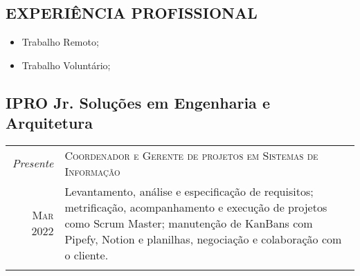     \begin{framed}
        \section{EXPERIÊNCIA PROFISSIONAL}
        \begin{itemize}
          \item Trabalho Remoto;
          \item Trabalho Voluntário;
    
        \end{itemize}
    
        \subsection{  IPRO Jr. Soluções em Engenharia e Arquitetura}
    
        \begin{tabular}{r|p{5cm}}
          \emph{Presente}   & \textsc{Coordenador e Gerente de projetos em Sistemas de Informação}                                                                                                                                                                                                                                          \\
          \textsc{Mar 2022} & \footnotesize{Levantamento, análise e especificação de requisitos; metrificação, acompanhamento e execução de projetos como Scrum Master; manutenção de KanBans com Pipefy, Notion e planilhas, negociação e colaboração com o cliente.}                                                                      \\
          \multicolumn{2}{c}{}                                                                                                                                                                                                                                                                                                              \\
    

\end{tabular}
\end{framed}
